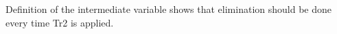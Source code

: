 \documentclass{lncs/llncs}
\begin{document}
Definition of the intermediate variable shows that elimination should be done every time Tr2 is applied.

\end{document}
